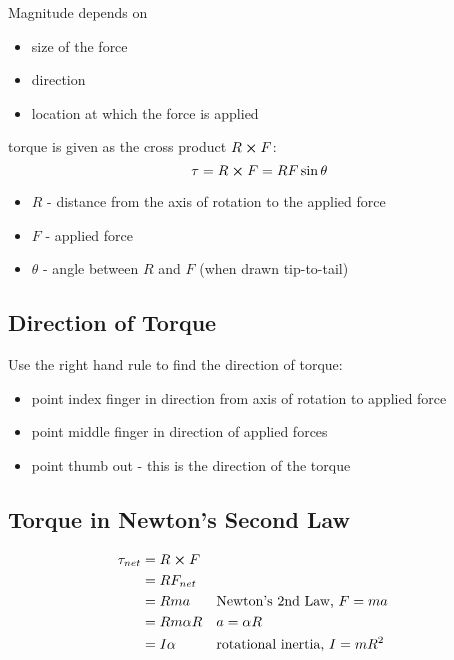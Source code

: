 \documentclass[titlepage]{article}
\begin{document}
Magnitude depends on
\begin{itemize}
    \item size of the force
    \item direction
    \item location at which the force is applied
\end{itemize}

torque is given as the cross product $R \cross F$:
\begin{equation*}
    \tau = R \cross F = RF \sin \theta
\end{equation*}

\begin{itemize}
    \item $R$ - distance from the axis of rotation to the applied force
    \item $F$ - applied force
    \item $\theta$ - angle between $R$ and $F$ (when drawn tip-to-tail)
\end{itemize}

\subsection{Direction of Torque}
Use the right hand rule to find the direction of torque:
\begin{itemize}
    \item point index finger in direction from axis of rotation to applied force
    \item point middle finger in direction of applied forces
    \item point thumb out - this is the direction of the torque
\end{itemize}

\subsection{Torque in Newton's Second Law}
\begin{align*}
    \tau_{net} &= R \cross F \\
    &= R F_{net} \\
    &= Rma && \text{Newton's 2nd Law, } F = ma\\
    &= Rm \alpha R && a = \alpha R\\
    &= I \alpha && \text{rotational inertia, } I = mR^2
\end{align*}
\end{document}
